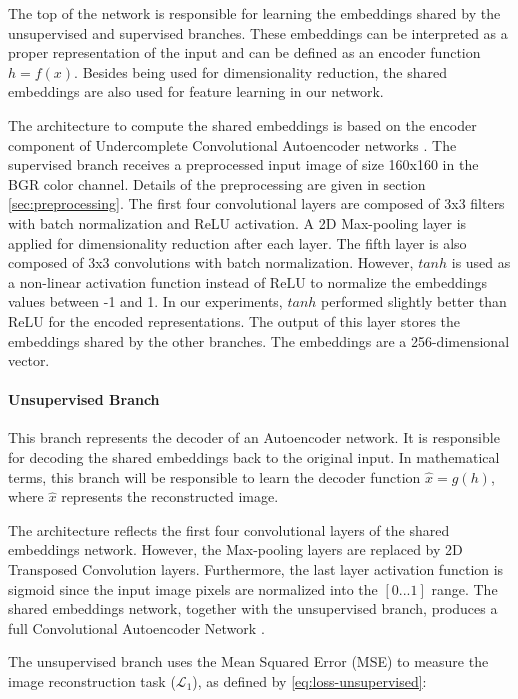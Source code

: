 The top of the network is responsible for learning the embeddings shared by the unsupervised and supervised branches. These embeddings can be interpreted as a proper representation of the input and can be defined as an encoder function $h = f(x)$. Besides being used for dimensionality reduction, the shared embeddings are also used for feature learning in our network.

The architecture to compute the shared embeddings is based on the encoder component of Undercomplete Convolutional Autoencoder networks \citep{goodfellow2016deep}. The supervised branch receives a preprocessed input image of size 160x160 in the BGR color channel. Details of the preprocessing are given in section \ref{sec:preprocessing}. The first four convolutional layers are composed of 3x3 filters with batch normalization and ReLU activation. A 2D Max-pooling layer is applied for dimensionality reduction after each layer. The fifth layer is also composed of 3x3 convolutions with batch normalization. However, $tanh$ is used as a non-linear activation function instead of ReLU to normalize the embeddings values between -1 and 1. In our experiments, $tanh$ performed slightly better than ReLU for the encoded representations. The output of this layer stores the embeddings shared by the other branches. The embeddings are a 256-dimensional vector.

\paragraph{Unsupervised Branch}

This branch represents the decoder of an Autoencoder network. It is responsible for decoding the shared embeddings back to the original input. In mathematical terms, this branch will be responsible to learn the decoder function $\hat{x} = g(h)$, where $\hat{x}$ represents the reconstructed image. 

The architecture reflects the first four convolutional layers of the shared embeddings network. However, the Max-pooling layers are replaced by 2D Transposed Convolution layers. Furthermore, the last layer activation function is sigmoid since the input image pixels are normalized into the $[0...1]$ range. The shared embeddings network, together with the unsupervised branch, produces a full Convolutional Autoencoder Network \citep{goodfellow2016deep}.

The unsupervised branch uses the Mean Squared Error (MSE) to measure the image reconstruction task ($\mathcal{L}_1$), as defined by \autoref{eq:loss-unsupervised}:


